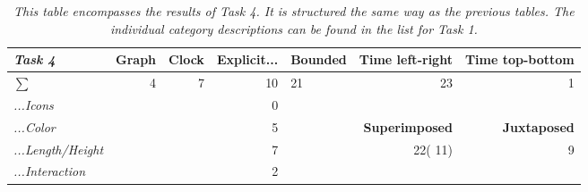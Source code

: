 \begin{table}[h]
	\centering
	\begin{tabular}{l|rr|r|lrr}
		\cline{2-7}
		\textit{\textbf{Task 4}} & \multicolumn{1}{l|}{\textbf{Graph}} & \multicolumn{1}{l|}{\textbf{Clock}} & \multicolumn{1}{l|}{\textbf{Explicit...}} & \multicolumn{1}{l|}{\textbf{Bounded}} & \multicolumn{1}{l|}{\textbf{Time left-right}} & \multicolumn{1}{l|}{\textbf{Time top-bottom}} \\ \hline
		\multicolumn{1}{|l|}{\textit{$\sum$}} & \multicolumn{1}{r|}{4} & 7 & 10 & \multicolumn{1}{l|}{21} & \multicolumn{1}{r|}{23} & \multicolumn{1}{r|}{1} \\ \hline
		\multicolumn{1}{|l|}{\textit{...Icons}} &  &  & 0 &  &  &  \\ \cline{1-1} \cline{4-4} \cline{6-7} 
		\multicolumn{1}{|l|}{\textit{...Color}} &  &  & 5 & \multicolumn{1}{l|}{} & \multicolumn{1}{r|}{\textbf{Superimposed}} & \multicolumn{1}{r|}{\textbf{Juxtaposed}} \\ \cline{1-1} \cline{4-4} \cline{6-7} 
		\multicolumn{1}{|l|}{\textit{...Length/Height}} &  &  & 7 & \multicolumn{1}{l|}{} & \multicolumn{1}{r|}{22({\color[HTML]{CB0000}  11})} & \multicolumn{1}{r|}{9} \\ \cline{1-1} \cline{4-4} \cline{6-7} 
		\multicolumn{1}{|l|}{\textit{...Interaction}} &  &  & 2 & \textit{} &  &  \\ \cline{1-1} \cline{4-4}
	\end{tabular}
\caption{\textit{This table encompasses the results of Task 4. It is structured the same way as the previous tables. The individual category descriptions can be found in the list for Task 1.}}
\label{tb:t4}
\end{table}
